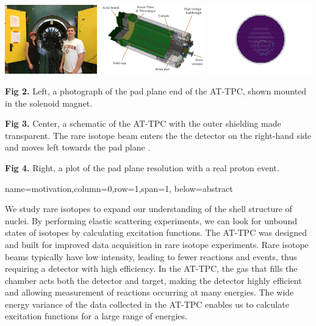 \documentclass[ansiepaperDNP,portrait]{baposter}
\begin{document}
\begin{poster}
{\begin{center}
\includegraphics [height=30mm]{michigan_trip.jpg} 
\hspace{0.2cm}
\includegraphics [height=30mm] {attpc.png}
\hspace{0.2cm}
\includegraphics [height=30mm] {padplane.png}
\end{center}


\small{\textbf{Fig 2.} Left, a photograph of the pad plane end of the AT-TPC, shown mounted in the solenoid magnet.}

\small{\textbf{Fig 3.} Center, a schematic of the AT-TPC with the outer shielding made transparent. The rare isotope beam enters the the detector on the right-hand side and moves left towards the pad plane \cite{Bradt-thesis}.}

\small{\textbf{Fig 4.} Right, a plot of the pad plane resolution with a real proton event.}

}
{name=motivation,column=0,row=1,span=1, below=abstract}
{\small{We study rare isotopes to expand our understanding of the shell structure of nuclei. By performing elastic scattering experiments, we can look for unbound states of isotopes by calculating excitation functions. The AT-TPC was designed and built for improved data acquisition in rare isotope experiments. Rare isotope beams typically have low intensity, leading to fewer reactions and events, thus requiring a detector with high efficiency. In the AT-TPC, the gas that fills the chamber acts both the detector and target, making the detector highly efficient and allowing measurement of reactions occurring at many energies. The wide energy variance of the data collected in the AT-TPC enables us to calculate excitation functions for a large range of energies.

}}
\end{poster}
\end{document}
